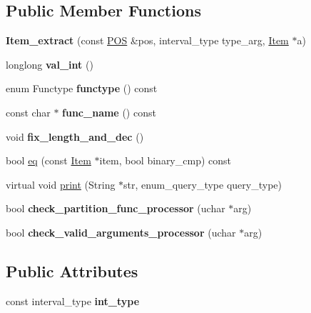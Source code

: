 \subsection*{Public Member Functions}
\begin{DoxyCompactItemize}
\item 
\mbox{\label{classItem__extract_ad7cbdb788ced07e03fed248f5eca4c9f}} 
{\bfseries Item\+\_\+extract} (const \mbox{\hyperlink{structYYLTYPE}{P\+OS}} \&pos, interval\+\_\+type type\+\_\+arg, \mbox{\hyperlink{classItem}{Item}} $\ast$a)
\item 
\mbox{\label{classItem__extract_a120ef829fa78ee8d2a75cd1cf83ab290}} 
longlong {\bfseries val\+\_\+int} ()
\item 
\mbox{\label{classItem__extract_a6dda0995f7668c716827b7a84e2a26d4}} 
enum Functype {\bfseries functype} () const
\item 
\mbox{\label{classItem__extract_a104bce831b226736039eecbabd65d70c}} 
const char $\ast$ {\bfseries func\+\_\+name} () const
\item 
\mbox{\label{classItem__extract_a2f12bbe23249854aa3f567d670b588b5}} 
void {\bfseries fix\+\_\+length\+\_\+and\+\_\+dec} ()
\item 
bool \mbox{\hyperlink{classItem__extract_ad12d12826c6f4231a4dde0150732c5aa}{eq}} (const \mbox{\hyperlink{classItem}{Item}} $\ast$item, bool binary\+\_\+cmp) const
\item 
virtual void \mbox{\hyperlink{classItem__extract_a5a2c762763085131a38bd15816bd361b}{print}} (String $\ast$str, enum\+\_\+query\+\_\+type query\+\_\+type)
\item 
\mbox{\label{classItem__extract_af37c2ff85774212ddbfc8182a5061690}} 
bool {\bfseries check\+\_\+partition\+\_\+func\+\_\+processor} (uchar $\ast$arg)
\item 
\mbox{\label{classItem__extract_acdbbbdbef6060d8c1501732dbeb615eb}} 
bool {\bfseries check\+\_\+valid\+\_\+arguments\+\_\+processor} (uchar $\ast$arg)
\end{DoxyCompactItemize}
\subsection*{Public Attributes}
\begin{DoxyCompactItemize}
\item 
\mbox{\label{classItem__extract_ab36f987f5104fd4ea5c4f2805b489a35}} 
const interval\+\_\+type {\bfseries int\+\_\+type}
\end{DoxyCompactItemize}
